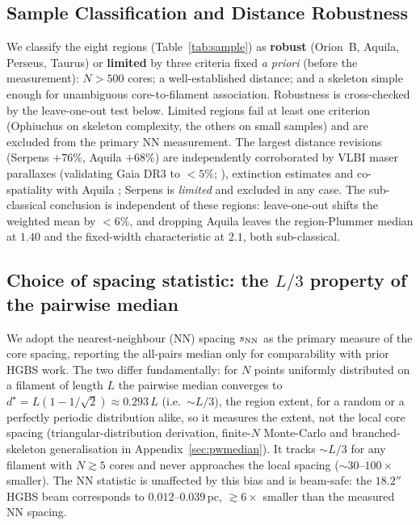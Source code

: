 \documentclass[usenatbib,twoside,twocolumn]{mnras}
\begin{document}
\subsection{Sample Classification and Distance Robustness}
\label{sec:distance_uncertainties}

We classify the eight regions (Table~\ref{tab:sample}) as \textbf{robust} (Orion~B, Aquila, Perseus, Taurus) or \textbf{limited} by three criteria fixed \emph{a priori} (before the measurement): $N>500$ cores; a well-established distance; and a skeleton simple enough for unambiguous core-to-filament association. Robustness is cross-checked by the leave-one-out test below. Limited regions fail at least one criterion (Ophiuchus on skeleton complexity, the others on small samples) and are excluded from the primary NN measurement. The largest distance revisions (Serpens $+76\%$, Aquila $+68\%$) are independently corroborated by VLBI maser parallaxes (validating Gaia DR3 to $<5\%$; \citealt{Kounkel2018,Xu2021,OrtizLeon2018,OrtizLeon2017}), extinction estimates \citep{Yan2022,Green2024} and co-spatiality with Aquila \citep{Zucker2020}; Serpens is \emph{limited} and excluded in any case. The sub-classical conclusion is independent of these regions: leave-one-out shifts the weighted mean by $<6\%$, and dropping Aquila leaves the region-Plummer median at $1.40$ and the fixed-width characteristic at $2.1$, both sub-classical.


\subsection{Choice of spacing statistic: the $L/3$ property of the pairwise median}
\label{sec:statistics}

We adopt the nearest-neighbour (NN) spacing $s_{\rm NN}$ as the primary measure of the core spacing, reporting the all-pairs median only for comparability with prior HGBS work. The two differ fundamentally: for $N$ points uniformly distributed on a filament of length $L$ the pairwise median converges to $d^\star=L(1-1/\sqrt{2})\approx0.293\,L$ (i.e.\ $\sim L/3$), the region extent, for a random or a perfectly periodic distribution alike, so it measures the extent, not the local core spacing (triangular-distribution derivation, finite-$N$ Monte-Carlo and branched-skeleton generalisation in Appendix~\ref{sec:pwmedian}). It tracks $\sim L/3$ for any filament with $N\gtrsim5$ cores and never approaches the local spacing ($\sim30$--$100\times$ smaller). The NN statistic is unaffected by this bias and is beam-safe: the $18.2''$ HGBS beam corresponds to $0.012$--$0.039$\,pc, $\gtrsim6\times$ smaller than the measured NN spacing.
\end{document}
